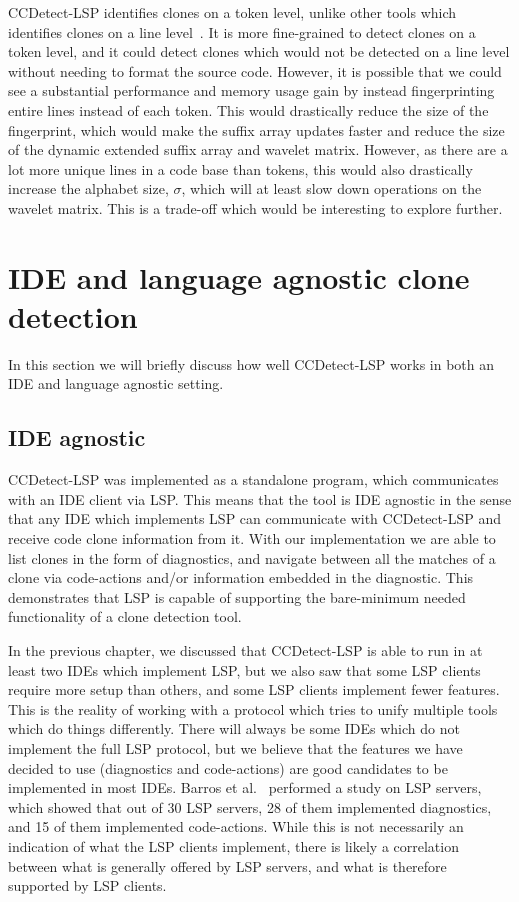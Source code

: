 CCDetect-LSP identifies clones on a token level, unlike other tools which identifies
clones on a line level~\cite{Zibran_real_time_search}. It is more fine-grained to detect
clones on a token level, and it could detect clones which would not be detected on a line
level without needing to format the source code. However, it is possible that we could see
a substantial performance and memory usage gain by instead fingerprinting entire lines
instead of each token. This would drastically reduce the size of the fingerprint, which
would make the suffix array updates faster and reduce the size of the dynamic extended
suffix array and wavelet matrix. However, as there are a lot more unique lines in a code
base than tokens, this would also drastically increase the alphabet size, $\sigma$, which
will at least slow down operations on the wavelet matrix. This is a trade-off which would
be interesting to explore further.

\section{IDE and language agnostic clone detection}

In this section we will briefly discuss how well CCDetect-LSP works in both an IDE and
language agnostic setting.

\subsection*{IDE agnostic}

CCDetect-LSP was implemented as a standalone program, which communicates with an IDE
client via LSP. This means that the tool is IDE agnostic in the sense that any IDE which
implements LSP can communicate with CCDetect-LSP and receive code clone information from
it. With our implementation we are able to list clones in the form of diagnostics, and
navigate between all the matches of a clone via code-actions and/or information embedded
in the diagnostic. This demonstrates that LSP is capable of supporting the bare-minimum
needed functionality of a clone detection tool.

In the previous chapter, we discussed that CCDetect-LSP is able to run in at least two
IDEs which implement LSP, but we also saw that some LSP clients require more setup than
others, and some LSP clients implement fewer features. This is the reality of working with
a protocol which tries to unify multiple tools which do things differently. There will
always be some IDEs which do not implement the full LSP protocol, but we believe that the
features we have decided to use (diagnostics and code-actions) are good candidates to be
implemented in most IDEs. Barros et al.~\cite{LSPPractices} performed a study on LSP
servers, which showed that out of 30 LSP servers, 28 of them implemented diagnostics, and
15 of them implemented code-actions. While this is not necessarily an indication of what
the LSP clients implement, there is likely a correlation between what is generally offered
by LSP servers, and what is therefore supported by LSP clients.

